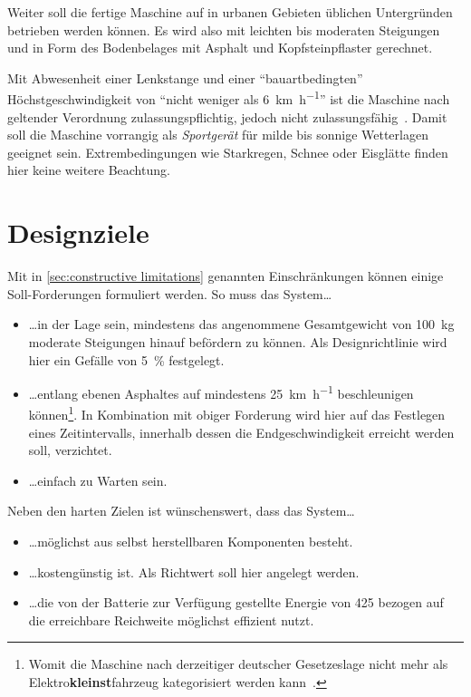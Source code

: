 			Weiter soll die fertige Maschine auf in urbanen Gebieten üblichen Untergründen betrieben werden können.
			Es wird also mit leichten bis moderaten Steigungen und in Form des Bodenbelages mit Asphalt und Kopfsteinpflaster gerechnet.\par\medskip
			Mit Abwesenheit einer Lenkstange und einer ``bauartbedingten'' Höchstgeschwindigkeit von ``nicht weniger als \qty{6}{\kilo\metre\per\hour}'' ist die Maschine nach geltender Verordnung zulassungspflichtig, jedoch nicht zulassungsfähig~\cite{Bundesgesetzblatt.2019}.
			Damit soll die Maschine vorrangig als \textit{Sportgerät} für milde bis sonnige Wetterlagen geeignet sein.
			Extrembedingungen wie Starkregen, Schnee oder Eisglätte finden hier keine weitere Beachtung.

	\section{Designziele}
		Mit in \cref{sec:constructive limitations} genannten Einschränkungen können einige Soll-Forderungen formuliert werden.
		So muss das System\ldots
		\begin{itemize}
			\item \ldots in der Lage sein, mindestens das angenommene Gesamtgewicht von \qty{100}{\kilo\gram} moderate Steigungen hinauf befördern zu können.
			Als Designrichtlinie wird hier ein Gefälle von \qty{5}{\percent} festgelegt.
			\item \ldots entlang ebenen Asphaltes auf mindestens \qty{25}{\kilo\metre\per\hour} beschleunigen können\footnote{\hspace{1mm}Womit die Maschine nach derzeitiger deutscher Gesetzeslage nicht mehr als Elektro\textbf{kleinst}fahrzeug kategorisiert werden kann~\cite{Bundesgesetzblatt.2019}.}.
			In Kombination mit obiger Forderung wird hier auf das Festlegen eines Zeitintervalls, innerhalb dessen die Endgeschwindigkeit erreicht werden soll, verzichtet.
			\item \ldots einfach zu Warten sein.
		\end{itemize}
		Neben den harten Zielen ist wünschenswert, dass das System\ldots
		\begin{itemize}
			\item \ldots möglichst aus selbst herstellbaren Komponenten besteht.
			\item \ldots kostengünstig ist.
			Als Richtwert soll hier  angelegt werden.
			\item \ldots die von der Batterie zur Verfügung gestellte Energie von \SI{425}{\watthour} bezogen auf die erreichbare Reichweite möglichst effizient nutzt.
		\end{itemize}